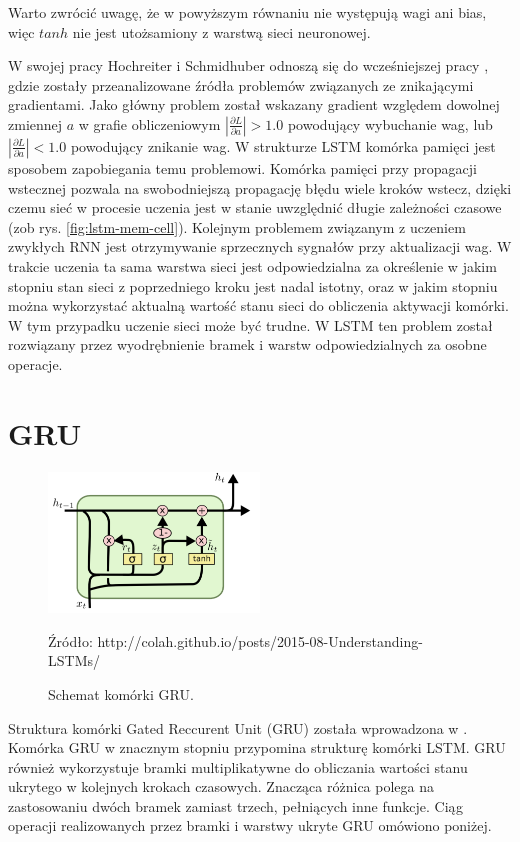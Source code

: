 \documentclass[oneside, mag]{mgr}
\begin{document}
Warto zwrócić uwagę, że w powyższym równaniu nie występują wagi ani bias, więc $tanh$ nie jest utożsamiony z warstwą sieci neuronowej.

W swojej pracy \cite{LSTM} Hochreiter i Schmidhuber odnoszą się do wcześniejszej pracy \cite{vanishing_gradient_RNN}, gdzie zostały przeanalizowane źródła problemów związanych ze znikającymi gradientami. Jako główny problem został wskazany gradient względem dowolnej zmiennej $a$ w grafie obliczeniowym $|\frac{\partial L}{\partial a}| > 1.0$ powodujący wybuchanie wag, lub $|\frac{\partial L}{\partial a}| < 1.0$ powodujący znikanie wag. W strukturze LSTM komórka pamięci jest sposobem zapobiegania temu problemowi. Komórka pamięci przy propagacji wstecznej pozwala na swobodniejszą propagację błędu wiele kroków wstecz, dzięki czemu sieć w procesie uczenia jest w stanie uwzględnić długie zależności czasowe (zob rys. \ref{fig:lstm-mem-cell}). Kolejnym problemem związanym z uczeniem zwykłych RNN jest otrzymywanie sprzecznych sygnałów przy aktualizacji wag. W trakcie uczenia ta sama warstwa sieci jest odpowiedzialna za określenie w jakim stopniu stan sieci z poprzedniego kroku jest nadal istotny, oraz w jakim stopniu można wykorzystać aktualną wartość stanu sieci do obliczenia aktywacji komórki. W tym przypadku uczenie sieci może być trudne. W LSTM ten problem został rozwiązany przez wyodrębnienie bramek i warstw odpowiedzialnych za osobne operacje.  

\section{GRU}

\begin{figure}
\centering
	\includegraphics[width=0.5\textwidth]{img/LSTM3-var-GRU.png}
	\caption{Schemat komórki GRU.} Źródło: http://colah.github.io/posts/2015-08-Understanding-LSTMs/
	\label{fig:gru}
\end{figure}

Struktura komórki Gated Reccurent Unit (GRU) została wprowadzona w \cite{DBLP:journals/corr/ChoMGBSB14}. Komórka GRU w znacznym stopniu przypomina strukturę komórki LSTM. GRU również wykorzystuje bramki multiplikatywne do obliczania wartości stanu ukrytego w kolejnych krokach czasowych. Znacząca różnica polega na zastosowaniu dwóch bramek zamiast trzech, pełniących inne funkcje. Ciąg operacji realizowanych przez bramki i warstwy ukryte GRU omówiono poniżej.
\end{document}
